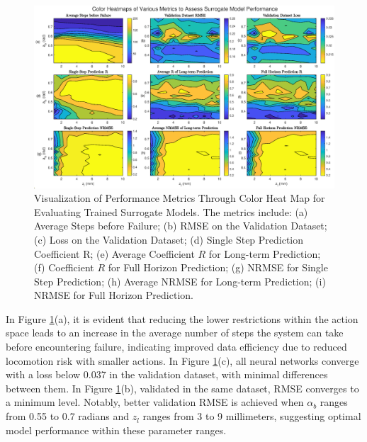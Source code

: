 \begin{figure}[htb]
    \centering
    \includegraphics[width=\linewidth]{img/chap5/NN_heat.eps}
    \caption{Visualization of Performance Metrics Through Color Heat Map for Evaluating Trained Surrogate Models. The metrics include: (a) Average Steps before Failure; (b) \ac{RMSE} on the Validation Dataset; (c) Loss on the Validation Dataset; (d) Single Step Prediction Coefficient R; (e) Average Coefficient $R$ for Long-term Prediction; (f) Coefficient $R$ for Full Horizon Prediction; (g) NRMSE for Single Step Prediction; (h) Average NRMSE for Long-term Prediction; (i) NRMSE for Full Horizon Prediction.}
    \label{fig:NN_heat}
\end{figure}

In Figure \ref{fig:NN_heat}(a), it is evident that reducing the lower restrictions within the action space leads to an increase in the average number of steps the system can take before encountering failure, indicating improved data efficiency due to reduced locomotion risk with smaller actions. In Figure \ref{fig:NN_heat}(c), all neural networks converge with a loss below 0.037 in the validation dataset, with minimal differences between them. In Figure \ref{fig:NN_heat}(b), validated in the same dataset, RMSE converges to a minimum level. Notably, better validation RMSE is achieved when $\alpha_b$ ranges from 0.55 to 0.7 radians and $z_l$ ranges from 3 to 9 millimeters, suggesting optimal model performance within these parameter ranges.


